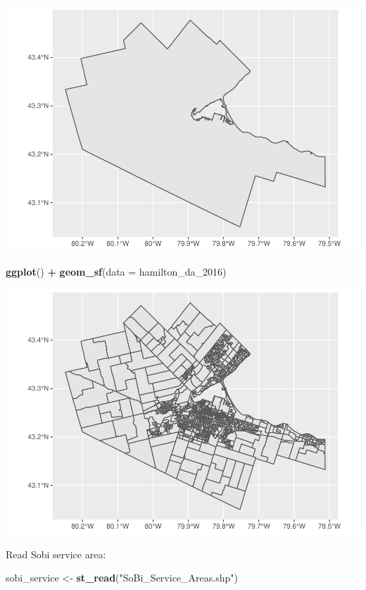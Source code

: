 \documentclass[
]{article}
\newenvironment{Shaded}{\begin{snugshade}}{\end{snugshade}}
\newcommand{\DataTypeTok}[1]{\textcolor[rgb]{0.13,0.29,0.53}{#1}}
\newcommand{\DecValTok}[1]{\textcolor[rgb]{0.00,0.00,0.81}{#1}}
\newcommand{\KeywordTok}[1]{\textcolor[rgb]{0.13,0.29,0.53}{\textbf{#1}}}
\newcommand{\NormalTok}[1]{#1}
\newcommand{\OperatorTok}[1]{\textcolor[rgb]{0.81,0.36,0.00}{\textbf{#1}}}
\newcommand{\StringTok}[1]{\textcolor[rgb]{0.31,0.60,0.02}{#1}}
\begin{document}
\includegraphics{00-Data-Processing-Example_files/figure-latex/unnamed-chunk-5-1.pdf}

\begin{Shaded}
\begin{Highlighting}[]
\KeywordTok{ggplot}\NormalTok{() }\OperatorTok{+}
\StringTok{  }\KeywordTok{geom_sf}\NormalTok{(}\DataTypeTok{data =}\NormalTok{ hamilton_da_}\DecValTok{2016}\NormalTok{)}
\end{Highlighting}
\end{Shaded}

\includegraphics{00-Data-Processing-Example_files/figure-latex/unnamed-chunk-6-1.pdf}

Read Sobi service area:

\begin{Shaded}
\begin{Highlighting}[]
\NormalTok{sobi_service <-}\StringTok{ }\KeywordTok{st_read}\NormalTok{(}\StringTok{"SoBi_Service_Areas.shp"}\NormalTok{)}
\end{Highlighting}
\end{Shaded}
\end{document}
